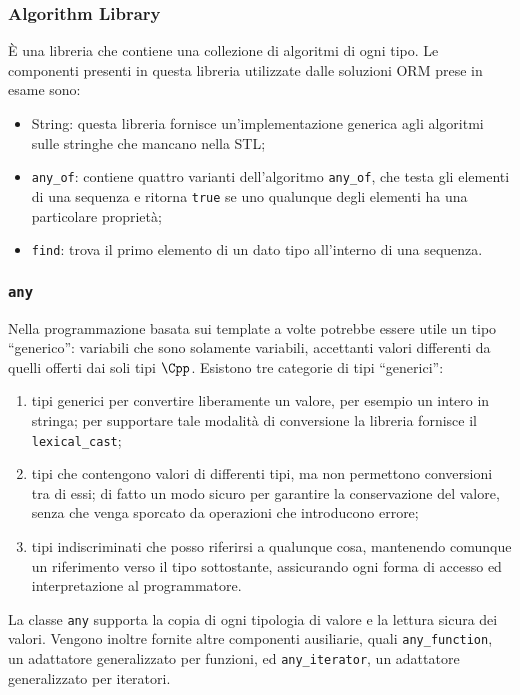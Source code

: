 \subsubsection{Algorithm Library}
È una libreria che contiene una collezione di algoritmi di ogni tipo.
Le componenti presenti in questa libreria utilizzate dalle soluzioni ORM
prese in esame sono:
\begin{itemize}
  \item String: questa libreria fornisce un'implementazione generica
  agli algoritmi sulle stringhe che mancano nella STL;
  \item {\tt any\_of}: contiene quattro varianti dell'algoritmo
  {\tt any\_of}, che testa gli elementi di una sequenza e ritorna
  {\tt true} se uno qualunque degli elementi ha una particolare
  proprietà;
  \item {\tt find}: trova il primo elemento di un dato tipo all'interno
  di una sequenza.
\end{itemize}

\subsubsection{{\tt any}}
Nella programmazione basata sui template a volte potrebbe essere utile
un tipo ``generico'': variabili che sono solamente variabili, accettanti
valori differenti da quelli offerti dai soli tipi $\Cpp$.
Esistono tre categorie di tipi ``generici'':
\begin{enumerate}
  \item tipi generici per convertire liberamente un valore, per esempio
  un intero in stringa; per supportare tale modalità di conversione la
  libreria fornisce il {\tt lexical\_cast};
  \item tipi che contengono valori di differenti tipi, ma non permettono
  conversioni tra di essi; di fatto un modo sicuro per garantire la
  conservazione del valore, senza che venga sporcato da operazioni che
  introducono errore;
  \item tipi indiscriminati che posso riferirsi a qualunque cosa,
  mantenendo comunque un riferimento verso il tipo sottostante,
  assicurando ogni forma di accesso ed interpretazione al programmatore.
\end{enumerate}
La classe {\tt any} supporta la copia di ogni tipologia di valore e la
lettura sicura dei valori.
Vengono inoltre fornite altre componenti ausiliarie, quali
{\tt any\_function}, un adattatore generalizzato per funzioni, ed
{\tt any\_iterator}, un adattatore generalizzato per iteratori.


